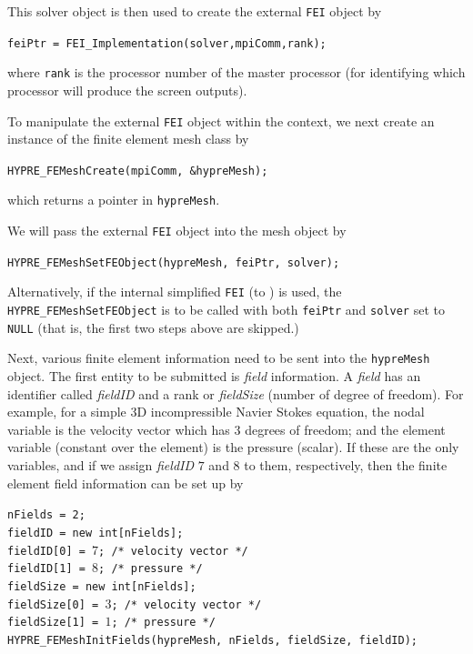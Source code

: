 This solver object is then used to create the external {\tt FEI} object by 
\begin{tabbing}
\hspace{0.5in} \= {\tt feiPtr = FEI\_Implementation(solver,mpiComm,rank);}
\end{tabbing}
where {\tt rank} is the processor number of the master processor (for 
identifying which processor will produce the screen outputs). 

To manipulate the external {\tt FEI} object within the \hypre{} context,
we next create an instance of the \hypre{} finite element mesh class by
\begin{tabbing}
\hspace{0.5in} \= {\tt HYPRE\_FEMeshCreate(mpiComm, \&hypreMesh);}
\end{tabbing}
which returns a pointer in {\tt hypreMesh}.

We will pass the external {\tt FEI} object into the \hypre{} mesh
object by
\begin{tabbing}
\hspace{0.5in} \= {\tt HYPRE\_FEMeshSetFEObject(hypreMesh, feiPtr, solver);}
\end{tabbing}
Alternatively, if the internal simplified {\tt FEI} (to \hypre{}) is used,
the {\tt HYPRE\_FEMeshSetFEObject} is to be called with both {\tt feiPtr}
and {\tt solver} set to {\tt NULL} (that is, the first two steps above
are skipped.)

Next, various finite element information need to be sent into the 
{\tt hypreMesh} object.
The first entity to be submitted is {\it field} information. 
A {\it field} has an identifier called {\it fieldID} and a rank or
{\it fieldSize} (number of degree of freedom). For example, for a simple
3D incompressible Navier Stokes equation, the nodal variable is the velocity
vector which has $3$ degrees of freedom; and the element variable (constant
over the element) is the pressure (scalar). If these are the only variables,
and if we assign {\it fieldID} $7$ and $8$ to them, respectively, then the
finite element field information can be set up by
\begin{tabbing}
\hspace{0.5in} \= {\tt nFields = 2;} \\
               \> {\tt fieldID = new int[nFields];} \\
               \> {\tt fieldID[0] = $7$; /* velocity vector */} \\
               \> {\tt fieldID[1] = $8$; /* pressure */} \\
               \> {\tt fieldSize = new int[nFields];} \\
               \> {\tt fieldSize[0] = $3$; /* velocity vector */} \\
               \> {\tt fieldSize[1] = $1$; /* pressure */ } \\
 \> {\tt HYPRE\_FEMeshInitFields(hypreMesh, nFields, fieldSize, fieldID);}
\end{tabbing}

